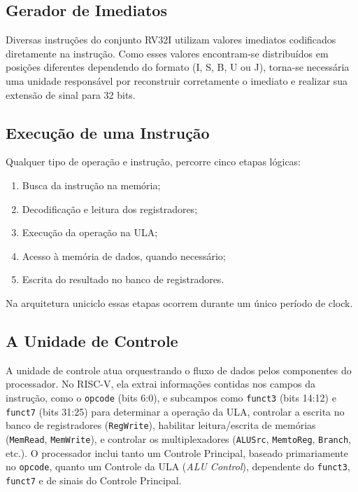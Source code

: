 \documentclass[conference]{IEEEtran}
\begin{document}
\subsection{Gerador de Imediatos}
Diversas instruções do conjunto RV32I utilizam valores imediatos codificados diretamente na instrução. Como esses valores encontram-se distribuídos em posições diferentes dependendo do formato (I, S, B, U ou J), torna-se necessária uma unidade responsável por reconstruir corretamente o imediato e realizar sua extensão de sinal para 32 bits.

\subsection{Execução de uma Instrução}
Qualquer tipo de operação e instrução, percorre cinco etapas lógicas:
\begin{enumerate}
\item Busca da instrução na memória;
\item Decodificação e leitura dos registradores;
\item Execução da operação na ULA;
\item Acesso à memória de dados, quando necessário;
\item Escrita do resultado no banco de registradores.
\end{enumerate}

Na arquitetura uniciclo essas etapas ocorrem durante um único período de clock.

\subsection{A Unidade de Controle}
A unidade de controle atua orquestrando o fluxo de dados pelos componentes do processador. No RISC-V, ela extrai informações contidas nos campos da instrução, como o \texttt{opcode} (bits 6:0), e subcampos como \texttt{funct3} (bits 14:12) e \texttt{funct7} (bits 31:25) para determinar a operação da ULA, controlar a escrita no banco de registradores (\texttt{RegWrite}), habilitar leitura/escrita de memórias (\texttt{MemRead}, \texttt{MemWrite}), e controlar os multiplexadores (\texttt{ALUSrc}, \texttt{MemtoReg}, \texttt{Branch}, etc.). O processador inclui tanto um Controle Principal, baseado primariamente no \texttt{opcode}, quanto um Controle da ULA (\textit{ALU Control}), dependente do \texttt{funct3}, \texttt{funct7} e de sinais do Controle Principal.
\end{document}
